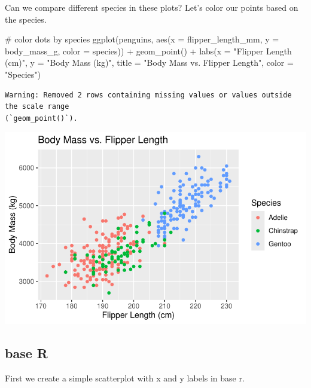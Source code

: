 \documentclass[
  letterpaper,
  DIV=11,
  numbers=noendperiod]{scrreprt}
\newenvironment{Shaded}{\begin{snugshade}}{\end{snugshade}}
\newcommand{\AttributeTok}[1]{\textcolor[rgb]{0.40,0.45,0.13}{#1}}
\newcommand{\CommentTok}[1]{\textcolor[rgb]{0.37,0.37,0.37}{#1}}
\newcommand{\FunctionTok}[1]{\textcolor[rgb]{0.28,0.35,0.67}{#1}}
\newcommand{\NormalTok}[1]{\textcolor[rgb]{0.00,0.23,0.31}{#1}}
\newcommand{\SpecialCharTok}[1]{\textcolor[rgb]{0.37,0.37,0.37}{#1}}
\newcommand{\StringTok}[1]{\textcolor[rgb]{0.13,0.47,0.30}{#1}}
\begin{document}
Can we compare different species in these plots? Let's color our points
based on the species.

\begin{Shaded}
\begin{Highlighting}[]
\CommentTok{\# color dots by species}
\FunctionTok{ggplot}\NormalTok{(penguins, }\FunctionTok{aes}\NormalTok{(}\AttributeTok{x =}\NormalTok{ flipper\_length\_mm, }\AttributeTok{y =}\NormalTok{ body\_mass\_g, }\AttributeTok{color =}\NormalTok{ species)) }\SpecialCharTok{+}
  \FunctionTok{geom\_point}\NormalTok{() }\SpecialCharTok{+}
  \FunctionTok{labs}\NormalTok{(}\AttributeTok{x =} \StringTok{"Flipper Length (cm)"}\NormalTok{, }\AttributeTok{y =} \StringTok{"Body Mass (kg)"}\NormalTok{,}
       \AttributeTok{title =} \StringTok{"Body Mass vs. Flipper Length"}\NormalTok{,}
       \AttributeTok{color =} \StringTok{"Species"}\NormalTok{)}
\end{Highlighting}
\end{Shaded}

\begin{verbatim}
Warning: Removed 2 rows containing missing values or values outside the scale range
(`geom_point()`).
\end{verbatim}

\includegraphics{scripts/02_dataViz/class4_files/figure-pdf/num_vs_num_species_ggplot-1.pdf}

\subsection{base R}

First we create a simple scatterplot with x and y labels in base r.

\begin{Shaded}
\end{Shaded}
\end{document}
